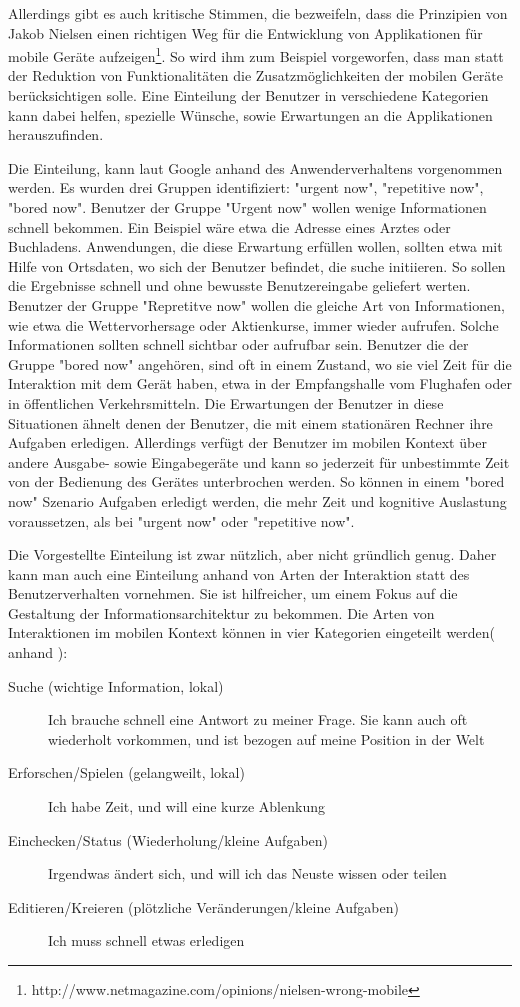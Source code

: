 Allerdings gibt es auch kritische Stimmen, die bezweifeln, dass die Prinzipien von Jakob Nielsen einen richtigen Weg für die Entwicklung von Applikationen für mobile Geräte aufzeigen\footnote{http://www.netmagazine.com/opinions/nielsen-wrong-mobile}. So wird ihm zum Beispiel vorgeworfen, dass man statt der Reduktion von Funktionalitäten die Zusatzmöglichkeiten der mobilen Geräte berücksichtigen solle. Eine Einteilung der Benutzer in verschiedene Kategorien kann dabei helfen, spezielle Wünsche, sowie Erwartungen an die Applikationen herauszufinden.

Die Einteilung, kann laut Google anhand des Anwenderverhaltens vorgenommen werden. Es wurden drei Gruppen identifiziert: "urgent now", "repetitive now", "bored now"\cite{googleUsers}. Benutzer der Gruppe "Urgent now" wollen wenige Informationen schnell bekommen. Ein Beispiel wäre etwa die Adresse eines  Arztes oder Buchladens. Anwendungen, die diese Erwartung erfüllen wollen, sollten etwa mit Hilfe von Ortsdaten, wo sich der Benutzer befindet, die suche initiieren. So sollen die Ergebnisse schnell und ohne bewusste Benutzereingabe geliefert werten. Benutzer der Gruppe "Repretitve now" wollen die gleiche Art von Informationen, wie etwa die Wettervorhersage oder Aktienkurse, immer wieder aufrufen. Solche Informationen sollten schnell sichtbar oder aufrufbar sein. Benutzer die der Gruppe "bored now" angehören, sind oft in einem Zustand, wo sie viel Zeit für die Interaktion mit dem Gerät haben, etwa in der Empfangshalle vom Flughafen oder in öffentlichen Verkehrsmitteln. Die Erwartungen der Benutzer in diese Situationen ähnelt denen der Benutzer, die mit einem stationären Rechner ihre Aufgaben erledigen. Allerdings verfügt der Benutzer im mobilen Kontext über andere Ausgabe- sowie Eingabegeräte und kann so jederzeit für unbestimmte Zeit von der Bedienung des Gerätes unterbrochen werden. So können in einem "bored now" Szenario Aufgaben erledigt werden, die mehr Zeit und kognitive Auslastung voraussetzen, als bei "urgent now" oder "repetitive now".

Die Vorgestellte Einteilung ist zwar nützlich, aber nicht gründlich genug. Daher kann man auch eine Einteilung anhand von Arten der Interaktion statt des Benutzerverhalten vornehmen. Sie ist hilfreicher, um einem Fokus auf die Gestaltung der Informationsarchitektur zu bekommen. Die  Arten von Interaktionen im mobilen Kontext können in vier Kategorien eingeteilt werden( anhand \cite[Seite 50]{mobileFirst}):

\begin{description}
 	\item[Suche (wichtige Information, lokal)] Ich brauche schnell eine Antwort zu meiner Frage. Sie kann auch oft wiederholt vorkommen, und ist bezogen auf meine Position in der Welt
 	\item[Erforschen/Spielen (gelangweilt, lokal)] Ich habe Zeit, und will eine kurze Ablenkung
 	\item[Einchecken/Status (Wiederholung/kleine Aufgaben)] Irgendwas ändert sich, und will ich das Neuste wissen oder teilen
 	\item[Editieren/Kreieren (plötzliche Veränderungen/kleine Aufgaben)] Ich muss schnell etwas erledigen
 \end{description} 

